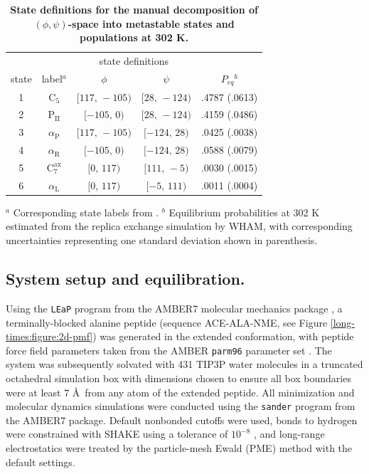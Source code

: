 \begin{table}[tb]
\caption{{\bf State definitions for the manual decomposition of $(\phi,\psi)$-space into metastable states and populations at 302 K.}}
\label{long-times:table:state-definitions}
\begin{center}
\begin{tabular}{ccccc}
\hline 
      &                        & \multicolumn{2}{c}{state definitions} & \\
\cline{3-4}
state & label$^a$ & $\phi$ & $\psi$ & $P_{eq}$$^b$ \\
\hline
1 & $\mathrm{C}_5$             & $[117, \, -105)$ & $[28, \, -124)$ & .4787 (.0613) \\
2 & $\mathrm{P}_\mathrm{II}$   & $[-105, \, 0)$   & $[28, \, -124)$ & .4159 (.0486) \\
3 & $\alpha_\mathrm{P}$        & $[117, \, -105)$ & $[-124, \, 28)$ & .0425 (.0038) \\
4 & $\alpha_\mathrm{R}$        & $[-105, \, 0)$   & $[-124, \, 28)$ & .0588 (.0079) \\
5 & $\mathrm{C}_7^\mathrm{ax}$ & $[0, \, 117)$    & $[111, \, -5)$  & .0030 (.0015) \\
6 & $\alpha_\mathrm{L}$        & $[0, \, 117)$    & $[-5, \, 111)$  & .0011 (.0004) \\
\hline 
\end{tabular}
\end{center}
\footnotesize
$^a$ Corresponding state labels from \cite{roterman:1989a}.  $^b$ Equilibrium probabilities at 302 K estimated from the replica exchange simulation by WHAM, with corresponding uncertainties representing one standard deviation shown in parenthesis.
\end{table}

\subsection{System setup and equilibration.}
\label{long-times:section:system-setup-and-equilibration}

Using the {\tt LEaP} program from the AMBER7 molecular mechanics package \cite{AMBER7}, a terminally-blocked alanine peptide (sequence ACE-ALA-NME, see Figure \ref{long-times:figure:2d-pmf}) was generated in the extended conformation, with peptide force field parameters taken from the AMBER {\tt parm96} parameter set \cite{AMBER-parm96}.
The system was subsequently solvated with 431 TIP3P water molecules \cite{jorgensen:1983a} in a truncated octahedral simulation box with dimensions chosen to ensure all box boundaries were at least $7$ \AA\ from any atom of the extended peptide.
All minimization and molecular dynamics simulations were conducted using the {\tt sander} program from the AMBER7 package.
Default nonbonded cutoffs were used, bonds to hydrogen were constrained with SHAKE using a tolerance of $10^{-8}$ \cite{SHAKE}, and long-range electrostatics were treated by the particle-mesh Ewald (PME) method \cite{darden:1993a} with the default settings.

